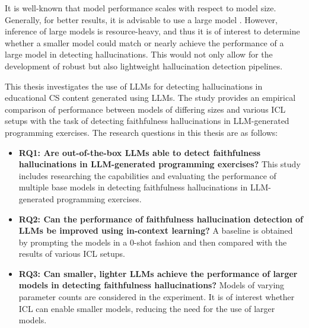 \documentclass[english, 12pt, a4paper, sci, utf8, a-2b, online]{latex/definitions/aaltothesis}
\begin{document}
It is well-known that model performance scales with respect to model size. Generally, for better results, it is advisable to use a large model \cite{wu2024performancelawlargelanguage}. However, inference of large models is resource-heavy, and thus it is of interest to determine whether a smaller model could match or nearly achieve the performance of a large model in detecting hallucinations. This would not only allow for the development of robust but also lightweight hallucination detection pipelines.

This thesis investigates the use of LLMs for detecting hallucinations in educational CS content generated using LLMs. The study provides an empirical comparison of performance between models of differing sizes and various ICL setups with the task of detecting faithfulness hallucinations in LLM-generated programming exercises. The research questions in this thesis are as follows:
\begin{itemize}
     \item \textbf{RQ1: Are out-of-the-box LLMs able to detect faithfulness hallucinations in LLM-generated programming exercises?} This study includes researching the capabilities and evaluating the performance of multiple base models in detecting faithfulness hallucinations in LLM-generated programming exercises. 
    \item \textbf{RQ2: Can the performance of faithfulness hallucination detection of LLMs be improved using in-context learning?} A baseline is obtained by prompting the models in a 0-shot fashion and then compared with the results of various ICL setups.
    \item \textbf{RQ3: Can smaller, lighter LLMs achieve the performance of larger models in detecting faithfulness hallucinations?} Models of varying parameter counts are considered in the experiment. It is of interest whether ICL can enable smaller models, reducing the need for the use of larger models.
\end{itemize}
\end{document}
